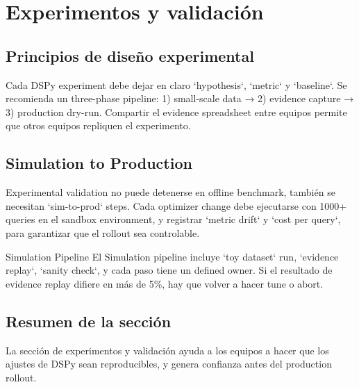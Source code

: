 \section{Experimentos y validación}

\subsection{Principios de diseño experimental}

Cada DSPy experiment debe dejar en claro `hypothesis`, `metric` y `baseline`. Se recomienda un three-phase pipeline: 1) small-scale data → 2) evidence capture → 3) production dry-run. Compartir el evidence spreadsheet entre equipos permite que otros equipos repliquen el experimento.

\subsection{Simulation to Production}

Experimental validation no puede detenerse en offline benchmark, también se necesitan `sim-to-prod` steps. Cada optimizer change debe ejecutarse con 1000+ queries en el sandbox environment, y registrar `metric drift` y `cost per query`, para garantizar que el rollout sea controlable.

\begin{knowledgebox}{Simulation Pipeline}
El Simulation pipeline incluye `toy dataset` run, `evidence replay`, `sanity check`, y cada paso tiene un defined owner. Si el resultado de evidence replay difiere en más de 5\%, hay que volver a hacer tune o abort.
\end{knowledgebox}

\subsection{Resumen de la sección}

La sección de experimentos y validación ayuda a los equipos a hacer que los ajustes de DSPy sean reproducibles, y genera confianza antes del production rollout.

